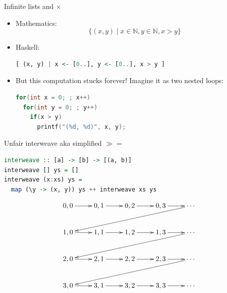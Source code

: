 \documentclass[handout]{beamer}
\def\N{\mathbb{N}}
\begin{document}
\begin{frame}[fragile]{Infinite lists and $\times$}
\begin{adjustwidth}{-1em}{-1em}

\begin{itemize}[<+->]

\item Mathematics:
$$ \{ (x, y) \mid x \in \N, y \in \N, x > y \} $$

\item Haskell:
\begin{lstlisting}[language=Haskell]
[ (x, y) | x <- [0..], y <- [0..], x > y ]
\end{lstlisting}

\item But this computation stucks forever! Imagine it as two nested loops:

\begin{lstlisting}[language=C]
for(int x = 0; ; x++)
  for(int y = 0; ; y++)
    if(x > y)
      printf("(%d, %d)", x, y);
\end{lstlisting}

\end{itemize}

\end{adjustwidth}
\end{frame}

\begin{frame}[fragile]{Unfair interweave aka simplified $\gg\!\!=$}

\begin{lstlisting}[language=Haskell]
interweave :: [a] -> [b] -> [(a, b)]
interweave [] ys = []
interweave (x:xs) ys =
  map (\y -> (x, y)) ys ++ interweave xs ys
\end{lstlisting}

$$\xymatrix{
0,0 \ar[r] & 0,1 \ar[r] & 0,2 \ar[r] & 0,3 \ar[r] & \cdots \ar[dllll] \\
1,0 \ar[r] & 1,1 \ar[r] & 1,2 \ar[r] & 1,3 \ar[r] & \cdots \ar[dllll] \\
2,0 \ar[r] & 2,1 \ar[r] & 2,2 \ar[r] & 2,3 \ar[r] & \cdots \ar[dllll] \\
3,0 \ar[r] & 3,1 \ar[r] & 3,2 \ar[r] & 3,3 \ar[r] & \cdots \\
}$$

\end{frame}
\end{document}
